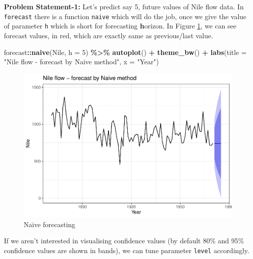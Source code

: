 \documentclass[
]{book}
\newenvironment{Shaded}{\begin{snugshade}}{\end{snugshade}}
\newcommand{\AttributeTok}[1]{\textcolor[rgb]{0.13,0.29,0.53}{#1}}
\newcommand{\DecValTok}[1]{\textcolor[rgb]{0.00,0.00,0.81}{#1}}
\newcommand{\FunctionTok}[1]{\textcolor[rgb]{0.13,0.29,0.53}{\textbf{#1}}}
\newcommand{\NormalTok}[1]{#1}
\newcommand{\SpecialCharTok}[1]{\textcolor[rgb]{0.81,0.36,0.00}{\textbf{#1}}}
\newcommand{\StringTok}[1]{\textcolor[rgb]{0.31,0.60,0.02}{#1}}
\begin{document}
\textbf{Problem Statement-1:} Let's predict say 5, future values of Nile flow data. In \texttt{forecast} there is a function \texttt{naive} which will do the job, once we give the value of parameter \texttt{h} which is short for forecasting \textbf{h}orizon. In Figure \ref{fig:naive}, we can see forecast values, in red, which are exactly same as previous/last value.

\begin{Shaded}
\begin{Highlighting}[]
\NormalTok{forecast}\SpecialCharTok{::}\FunctionTok{naive}\NormalTok{(Nile, }\AttributeTok{h =} \DecValTok{5}\NormalTok{) }\SpecialCharTok{\%\textgreater{}\%} 
  \FunctionTok{autoplot}\NormalTok{() }\SpecialCharTok{+}
  \FunctionTok{theme\_bw}\NormalTok{() }\SpecialCharTok{+}
  \FunctionTok{labs}\NormalTok{(}\AttributeTok{title =} \StringTok{"Nile flow {-} forecast by Naive method"}\NormalTok{,}
       \AttributeTok{x =} \StringTok{"Year"}\NormalTok{)}
\end{Highlighting}
\end{Shaded}

\begin{figure}

{\centering \includegraphics[width=0.98\linewidth]{DauR_files/figure-latex/naive-1} 

}

\caption{Naive forecasting}\label{fig:naive}
\end{figure}

If we aren't interested in visualising confidence values (by default 80\% and 95\% confidence values are shown in bands), we can tune parameter \texttt{level} accordingly.
\end{document}
